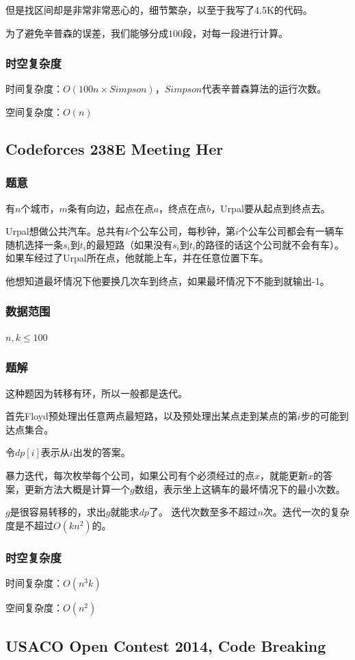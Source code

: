 \documentclass{ctexart}
\begin{document}
但是找区间却是非常非常恶心的，细节繁杂，以至于我写了4.5K的代码。

为了避免辛普森的误差，我们能够分成$100$段，对每一段进行计算。
\subsubsection{时空复杂度}
时间复杂度：$O(100n\times Simpson)$，$Simpson$代表辛普森算法的运行次数。

空间复杂度：$O(n)$
\subsection{Codeforces 238E Meeting Her}
\subsubsection{题意}
有$n$个城市，$m$条有向边，起点在点$a$，终点在点$b$，Urpal要从起点到终点去。

Urpal想做公共汽车。总共有$k$个公车公司，每秒钟，第$i$个公车公司都会有一辆车随机选择一条$s_i$到$t_i$的最短路（如果没有$s_i$到$t_i$的路径的话这个公司就不会有车）。如果车经过了Urpal所在点，他就能上车，并在任意位置下车。

他想知道最坏情况下他要换几次车到终点，如果最坏情况下不能到就输出-1。
\subsubsection{数据范围}
$n,k \le 100$
\subsubsection{题解}
这种题因为转移有环，所以一般都是迭代。

首先Floyd预处理出任意两点最短路，以及预处理出某点走到某点的第$i$步的可能到达点集合。

令$dp[i]$表示从$i$出发的答案。

暴力迭代，每次枚举每个公司，如果公司有个必须经过的点$x$，就能更新$x$的答案，更新方法大概是计算一个$g$数组，表示坐上这辆车的最坏情况下的最小次数。

$g$是很容易转移的，求出$g$就能求$dp$了。
迭代次数至多不超过$n$次。迭代一次的复杂度是不超过$O(kn^2)$的。
\subsubsection{时空复杂度}
时间复杂度：$O(n^3k)$

空间复杂度：$O(n^2)$
\subsection{USACO Open Contest 2014, Code Breaking}
\end{document}
